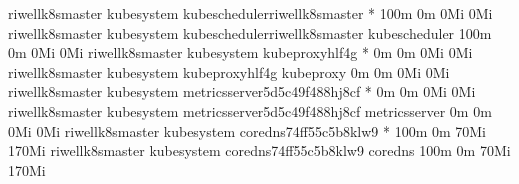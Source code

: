 \documentclass[letterpaper,10pt,english]{sphinxmanual}
\begin{document}
\begin{sphinxVerbatim}[commandchars=\\\{\}]
riwell\PYGZhy{}k8s\PYGZhy{}master   kube\PYGZhy{}system   kube\PYGZhy{}scheduler\PYGZhy{}riwell\PYGZhy{}k8s\PYGZhy{}master            *                         100m \PYGZpc{}      0m \PYGZpc{}      0Mi \PYGZpc{}          0Mi \PYGZpc{}
riwell\PYGZhy{}k8s\PYGZhy{}master   kube\PYGZhy{}system   kube\PYGZhy{}scheduler\PYGZhy{}riwell\PYGZhy{}k8s\PYGZhy{}master            kube\PYGZhy{}scheduler            100m \PYGZpc{}      0m \PYGZpc{}      0Mi \PYGZpc{}          0Mi \PYGZpc{}
riwell\PYGZhy{}k8s\PYGZhy{}master   kube\PYGZhy{}system   kube\PYGZhy{}proxy\PYGZhy{}hlf4g                            *                         0m \PYGZpc{}        0m \PYGZpc{}      0Mi \PYGZpc{}          0Mi \PYGZpc{}
riwell\PYGZhy{}k8s\PYGZhy{}master   kube\PYGZhy{}system   kube\PYGZhy{}proxy\PYGZhy{}hlf4g                            kube\PYGZhy{}proxy                0m \PYGZpc{}        0m \PYGZpc{}      0Mi \PYGZpc{}          0Mi \PYGZpc{}
riwell\PYGZhy{}k8s\PYGZhy{}master   kube\PYGZhy{}system   metrics\PYGZhy{}server\PYGZhy{}5d5c49f488\PYGZhy{}hj8cf             *                         0m \PYGZpc{}        0m \PYGZpc{}      0Mi \PYGZpc{}          0Mi \PYGZpc{}
riwell\PYGZhy{}k8s\PYGZhy{}master   kube\PYGZhy{}system   metrics\PYGZhy{}server\PYGZhy{}5d5c49f488\PYGZhy{}hj8cf             metrics\PYGZhy{}server            0m \PYGZpc{}        0m \PYGZpc{}      0Mi \PYGZpc{}          0Mi \PYGZpc{}
riwell\PYGZhy{}k8s\PYGZhy{}master   kube\PYGZhy{}system   coredns\PYGZhy{}74ff55c5b\PYGZhy{}8klw9                     *                         100m \PYGZpc{}      0m \PYGZpc{}      70Mi \PYGZpc{}         170Mi \PYGZpc{}
riwell\PYGZhy{}k8s\PYGZhy{}master   kube\PYGZhy{}system   coredns\PYGZhy{}74ff55c5b\PYGZhy{}8klw9                     coredns                   100m \PYGZpc{}      0m \PYGZpc{}      70Mi \PYGZpc{}         170Mi \PYGZpc{}

\end{sphinxVerbatim}
\end{document}
